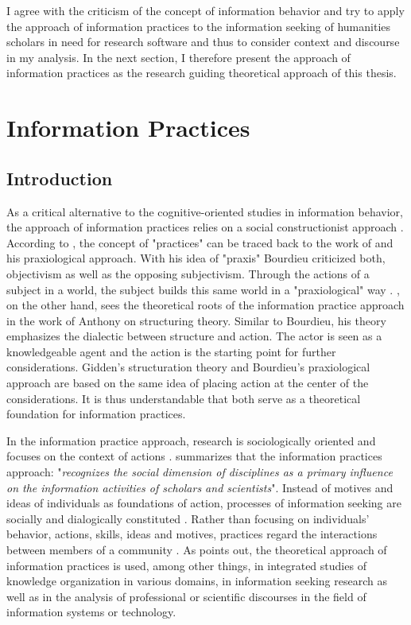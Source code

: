 \documentclass[12pt, a4paper, titlepage, oneside, abstract=true, toc=listof, toc=bibliography, BCOR=1cm]{scrreprt}
\begin{document}
I agree with the criticism of the concept of information behavior and try to apply the approach of information practices to the information seeking of humanities scholars in need for research software and thus to consider context and discourse in my analysis. In the next section, I therefore present the approach of information practices as the research guiding theoretical approach of this thesis. 

\section{Information Practices}
\label{sec:IP}
\subsection{Introduction}
As a critical alternative to the cognitive-oriented studies in information behavior, the approach of information practices relies on a social constructionist approach \citep{Savolainen2007}. According to \citep[p. 102]{Araujo2019}, the concept of "practices" can be traced back to the work of \citet{Bourdieu1994} and his praxiological approach. With his idea of "praxis" Bourdieu criticized both, objectivism as well as the opposing subjectivism. Through the actions of a subject in a world, the subject builds this same world in a "praxiological" way \citep[p. 102]{Araujo2019}. \citep[p. 120]{Savolainen2007}, on the other hand, sees the theoretical roots of the information practice approach in the work of Anthony \citet{Giddens1984} on structuring theory. Similar to Bourdieu, his theory emphasizes the dialectic between structure and action. The actor is seen as a knowledgeable agent and the action is the starting point for further considerations. Gidden's structuration theory and Bourdieu's praxiological approach are based on the same idea of placing action at the center of the considerations. It is thus understandable that both serve as a theoretical foundation for information practices. 

In the information practice approach, research is sociologically oriented and focuses on the context of actions \citep{Talja2005a}. \citet{Palmer2009} summarizes that the information practices approach: "\textit{recognizes the social dimension of disciplines as a primary influence on the information activities of scholars and scientists}". Instead of motives and ideas of individuals as foundations of action, processes of information seeking are socially and dialogically constituted \citep[p. 120]{Savolainen2007}. Rather than focusing on individuals' behavior, actions, skills, ideas and motives, practices regard the interactions between members of a community \citep{Tuominen2005}. As \citet[p. 93]{Talja2005} points out, the theoretical approach of information practices is used, among other things, in integrated studies of knowledge organization in various domains, in information seeking research as well as in the analysis of professional or scientific discourses in the field of information systems or technology. 
\end{document}
